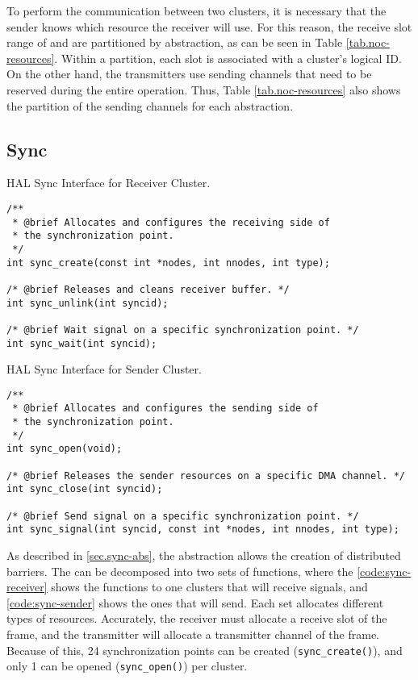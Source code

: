 	To perform the communication between two clusters, it is necessary that the
	sender knows which resource the receiver will use.
	For this reason, the receive slot range of \cnoc and \dnoc are partitioned
	by abstraction, as can be seen in Table \ref{tab.noc-resources}.
	Within a partition, each slot is associated with a cluster's logical ID.
	On the other hand, the transmitters use sending channels that need to
	be reserved during the entire operation.
	Thus, Table \ref{tab.noc-resources} also shows the partition of the
	sending channels for each abstraction.

	\subsection{Sync}

\begin{listing}[t]
\caption{HAL Sync Interface for Receiver Cluster.}
\label{code:sync-receiver}
\begin{verbatim}
/**
 * @brief Allocates and configures the receiving side of
 * the synchronization point.
 */
int sync_create(const int *nodes, int nnodes, int type);

/* @brief Releases and cleans receiver buffer. */
int sync_unlink(int syncid);

/* @brief Wait signal on a specific synchronization point. */
int sync_wait(int syncid);
\end{verbatim}
\end{listing}

\begin{listing}[t]
\caption{HAL Sync Interface for Sender Cluster.}
\label{code:sync-sender}
\begin{verbatim}
/**
 * @brief Allocates and configures the sending side of
 * the synchronization point.
 */
int sync_open(void);

/* @brief Releases the sender resources on a specific DMA channel. */
int sync_close(int syncid);

/* @brief Send signal on a specific synchronization point. */
int sync_signal(int syncid, const int *nodes, int nnodes, int type);
\end{verbatim}
\end{listing}

		As described in \autoref{sec.sync-abs}, the \sync abstraction allows the
		creation of distributed barriers.
		The \sync can be decomposed into two sets of functions, where the
		\autoref{code:sync-receiver} shows the functions to one clusters
		that will receive signals, and \autoref{code:sync-sender} shows the
		ones that will send.
		Each set allocates different types of resources.
		Accurately, the receiver must allocate a receive slot of the frame,
		and the transmitter will allocate a transmitter channel of the frame.
		Because of this, 24 synchronization points can be created (\texttt{sync\_create()}),
		and only 1 can be opened (\texttt{sync\_open()}) per cluster.

